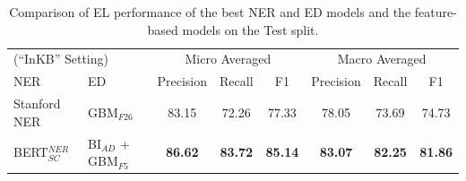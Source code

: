 \documentclass{report}
\theoremstyle{definition}
\theoremstyle{remark}
\begin{document}
\begin{table}
    \vspace{0.5cm}\begin{tabular}{l l c c c| c c c}
    \multicolumn{2}{l}{(``InKB'' Setting)}&\multicolumn{3}{c|}{Micro Averaged}&\multicolumn{3}{c}{Macro Averaged} \\
    NER & ED &Precision&Recall&F1&Precision&Recall&F1\\
    \hline
    Stanford NER  & GBM$_{F26}$ & 83.15&	72.26&	77.33&	78.05&	73.69&	74.73
\\
    BERT$_{SC}^{NER}$ & BI$_{AD}$ + GBM$_{F5}$ &\textcolor{ao}{\textbf{86.62}}&\textcolor{ao}{\textbf{83.72}}&\textcolor{ao}{\textbf{85.14}}&\textcolor{ao}{\textbf{83.07}}&\textcolor{ao}{\textbf{82.25}}&\textcolor{ao}{\textbf{81.86}} \\
    \end{tabular}
    \caption{Comparison of EL performance of the best NER and ED models and the feature-based models on the Test split.}
    \label{tab:elresultstest}
\end{table}
\end{document}
